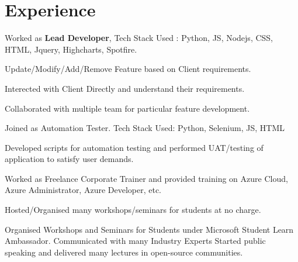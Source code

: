 \documentclass[]{Resume}
\begin{document}
\begin{minipage}[t]{0.33\textwidth}
%
%

\end{minipage} 
\hfill
\begin{minipage}[t]{0.66\textwidth} 


\section{Experience}
\vspace{\topsep}
\begin{tightemize}
\item Worked as \textbf{Lead Developer}, Tech Stack Used : Python, JS, Nodejs, CSS, HTML, Jquery, Highcharts, Spotfire.
\item Update/Modify/Add/Remove Feature based on Client requirements.
\item Interected with Client Directly and understand their requirements.
\item Collaborated with multiple team for particular feature development.
\end{tightemize}
\sectionsep

\begin{tightemize}
\item Joined as Automation Tester. Tech Stack Used: Python, Selenium, JS, HTML
\item Developed scripts for automation testing and performed UAT/testing of application to satisfy user demands.
\end{tightemize}
\sectionsep

\begin{tightemize}
\item Worked as Freelance Corporate Trainer and provided training on Azure Cloud, Azure Administrator, Azure Developer, etc.
\item Hosted/Organised many workshops/seminars for students at no charge.
\end{tightemize}
\sectionsep

\begin{tightemize}
\item Organised Workshops and Seminars for Students under Microsoft Student Learn Ambassador. Communicated with many Industry Experts Started public speaking and delivered many lectures in open-source communities.
\end{tightemize}
\sectionsep


\end{minipage}
\end{document}
